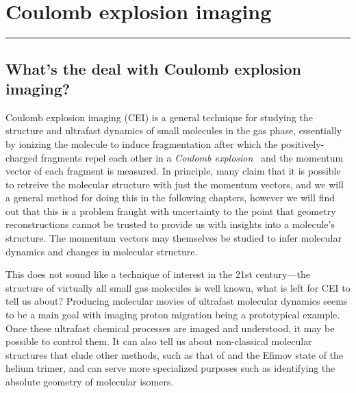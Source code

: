 \chapter{Coulomb explosion imaging}\label{ch:CEI}

\vspace{-1.5 em}
\begin{addmargin}[-0.5cm]{0cm}
  \minitoc
\end{addmargin}
\hrule
\vspace{1.5 em}

\section{What's the deal with Coulomb explosion imaging?}
Coulomb explosion imaging (CEI) is a general technique for studying the structure and ultrafast dynamics of small molecules in the gas phase, essentially by ionizing the molecule to induce fragmentation after which the positively-charged fragments repel each other in a \emph{Coulomb explosion}\footnotemark~ and the momentum vector of each fragment is measured. In principle, many claim that it is possible to retreive the molecular structure with just the momentum vectors, and we will a general method for doing this in the following chapters, however we will find out that this is a problem fraught with uncertainty to the point that geometry reconstructions cannot be trusted to provide us with insights into a molecule's structure. The momentum vectors may themselves be studied to infer molecular dynamics and changes in molecular structure.


This does not sound like a technique of interest in the 21st century---the structure of virtually all small gas molecules is well known, what is left for CEI to tell us about? Producing molecular movies of ultrafast molecular dynamics seems to be a main goal with imaging proton migration being a prototypical example. Once these ultrafast chemical processes are imaged and understood, it may be possible to control them. It can also tell us about non-classical molecular structures that elude other methods, such as that of  and the Efimov state of the helium trimer, and can serve more specialized purposes such as identifying the absolute geometry of molecular isomers.

